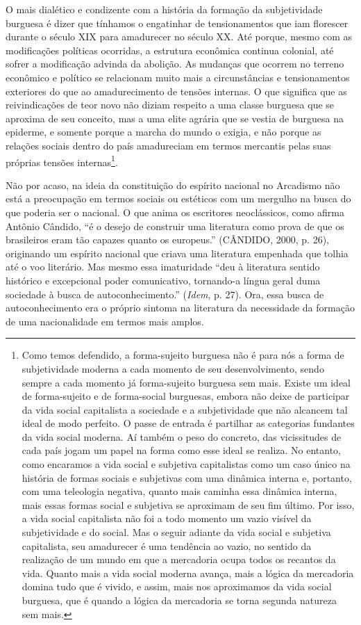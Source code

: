 O mais dialético e condizente com a história da formação da
subjetividade burguesa é dizer que tínhamos o engatinhar de
tensionamentos que iam florescer durante o século XIX para amadurecer no
século XX. Até porque, mesmo com as modificações políticas ocorridas, a
estrutura econômica continua colonial, até sofrer a modificação advinda
da abolição. As mudanças que ocorrem no terreno econômico e político se
relacionam muito mais a circunstâncias e tensionamentos exteriores do
que ao amadurecimento de tensões internas. O que significa que as
reivindicações de teor novo não diziam respeito a uma classe burguesa
que se aproxima de seu conceito, mas a uma elite agrária que se vestia
de burguesa na epiderme, e somente porque a marcha do mundo o exigia, e
não porque as relações sociais dentro do país amadureciam em termos
mercantis pelas suas próprias tensões internas\footnote{Como temos
  defendido, a forma-sujeito burguesa não é para nós a forma de
  subjetividade moderna a cada momento de seu desenvolvimento, sendo
  sempre a cada momento já forma-sujeito burguesa sem mais. Existe um
  ideal de forma-sujeito e de forma-social burguesas, embora não deixe
  de participar da vida social capitalista a sociedade e a subjetividade
  que não alcancem tal ideal de modo perfeito. O passe de entrada é
  partilhar as categorias fundantes da vida social moderna. Aí também o
  peso do concreto, das vicissitudes de cada país jogam um papel na
  forma como esse ideal se realiza. No entanto, como encaramos a vida
  social e subjetiva capitalistas como um caso único na história de
  formas sociais e subjetivas com uma dinâmica interna e, portanto, com
  uma teleologia negativa, quanto mais caminha essa dinâmica interna,
  mais essas formas social e subjetiva se aproximam de seu fim último.
  Por isso, a vida social capitalista não foi a todo momento um vazio
  visível da subjetividade e do social. Mas o seguir adiante da vida
  social e subjetiva capitalista, seu amadurecer é uma tendência ao
  vazio, no sentido da realização de um mundo em que a mercadoria ocupa
  todos os recantos da vida. Quanto mais a vida social moderna avança,
  mais a lógica da mercadoria domina tudo que é vivido, e assim, mais
  nos aproximamos da vida social burguesa, que é quando a lógica da
  mercadoria se torna segunda natureza sem mais.}.

Não por acaso, na ideia da constituição do espírito nacional no
Arcadismo não está a preocupação em termos sociais ou estéticos com um
mergulho na busca do que poderia ser o nacional. O que anima os
escritores neoclássicos, como afirma Antônio Cândido, ``é o desejo de
construir uma literatura como prova de que os brasileiros eram tão
capazes quanto os europeus.'' (CÂNDIDO, 2000, p. 26), originando um
espírito nacional que criava uma literatura empenhada que tolhia até o
voo literário. Mas mesmo essa imaturidade ``deu à literatura sentido
histórico e excepcional poder comunicativo, tornando-a língua geral duma
sociedade à busca de autoconhecimento.'' (\emph{Idem}, p. 27). Ora, essa
busca de autoconhecimento era o próprio sintoma na literatura da
necessidade da formação de uma nacionalidade em termos mais amplos.

